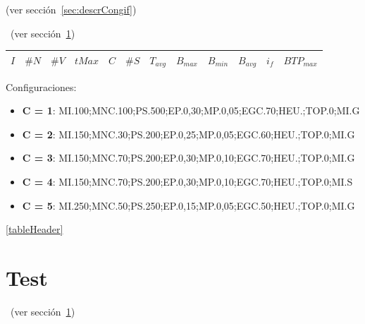 
\label{sec:descrCongif}
(ver sección~\ref{sec:descrCongif})

\label{sec:brkga}
~(ver sección~\ref{sec:brkga})


\begin{center}
\begin{tabular}{ |c|c|c|c|c|c|c|c|c|c|c| } 
 \hline
$I$ & $\#N$ & $\#V$ & $tMax$ & $C$ & $\#S$ & $T_{avg}$ & $B_{max}$ & $B_{min}$ & $B_{avg}$ & $i_{f}$ & $BTP_{max}$ \\
\hline
\end{tabular}
\end{center}




Configuraciones: 
\begin{itemize}
  \item \textbf{C = 1}: MI.100;MNC.100;PS.500;EP.0,30;MP.0,05;EGC.70;HEU.;TOP.0;MI.G
  \item \textbf{C = 2}: MI.150;MNC.30;PS.200;EP.0,25;MP.0,05;EGC.60;HEU.;TOP.0;MI.G 
  \item \textbf{C = 3}: MI.150;MNC.70;PS.200;EP.0,30;MP.0,10;EGC.70;HEU.;TOP.0;MI.G
  \item \textbf{C = 4}: MI.150;MNC.70;PS.200;EP.0,30;MP.0,10;EGC.70;HEU.;TOP.0;MI.S
  \item \textbf{C = 5}: MI.250;MNC.50;PS.250;EP.0,15;MP.0,05;EGC.50;HEU.;TOP.0;MI.G 
\end{itemize}


\label{tableHeader}
\ref{tableHeader}


\chapter{Test}


\label{sec:brkga}
~(ver sección~\ref{sec:brkga})

